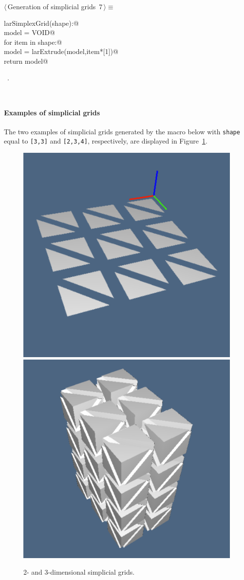 \documentclass[11pt,oneside]{article}	%
\begin{document}
\begin{flushleft} \small
\begin{minipage}{\linewidth} \label{scrap6}
\protect{}$\langle\,$Generation of simplicial grids\nobreak\ {\footnotesize 7}$\,\rangle\equiv$
\vspace{-1ex}
\begin{list}{}{} \item
\mbox{}\verb@def larSimplexGrid(shape):@\\
\mbox{}\verb@    model = VOID@\\
\mbox{}\verb@    for item in shape:@\\
\mbox{}\verb@        model = larExtrude(model,item*[1])@\\
\mbox{}\verb@    return model@\\
\mbox{}\verb@@{\NWsep}
\end{list}
\vspace{-1ex}
\footnotesize\addtolength{\baselineskip}{-1ex}
\begin{list}{}{\setlength{\itemsep}{-\parsep}\setlength{\itemindent}{-\leftmargin}}
\item \NWtxtMacroRefIn\ .
\end{list}
\end{minipage}\\[4ex]
\end{flushleft}


\paragraph{Examples of simplicial grids} The two examples of simplicial grids generated by the macro below with \texttt{shape} equal to \texttt{[3,3]} and \texttt{[2,3,4]}, respectively, are displayed in Figure~\ref{fig:simplexn-3}.

\begin{figure}[htbp] %
   \centering
   \includegraphics[height=0.25\linewidth,width=0.25\linewidth]{images/simplexn-3a} 
   \includegraphics[height=0.25\linewidth,width=0.25\linewidth]{images/simplexn-3b} 
   \caption{2- and 3-dimensional simplicial grids.}
   \label{fig:simplexn-3}
\end{figure}
\end{document}
